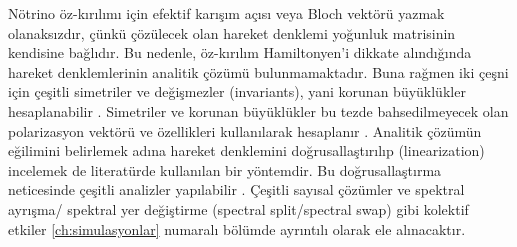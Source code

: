 Nötrino öz-kırılımı için efektif karışım açısı veya Bloch vektörü yazmak olanaksızdır, çünkü çözülecek olan hareket denklemi yoğunluk matrisinin kendisine bağlıdır. Bu nedenle, öz-kırılım Hamiltonyen'i dikkate alındığında hareket denklemlerinin analitik çözümü bulunmamaktadır. Buna rağmen iki çeşni için çeşitli simetriler ve değişmezler (invariants), yani korunan büyüklükler hesaplanabilir \cite{Pehlivan:2011hp}. Simetriler ve korunan büyüklükler bu tezde bahsedilmeyecek olan polarizasyon vektörü ve özellikleri kullanılarak hesaplanır \cite{fackler1986Massive}. Analitik çözümün eğilimini belirlemek adına hareket denklemini doğrusallaştırılıp (linearization) incelemek de literatürde kullanılan bir yöntemdir. Bu doğrusallaştırma neticesinde çeşitli analizler yapılabilir \cite{Chakraborty:2014lsa, Chakraborty:2019wxe, Xiong:2021dex}. Çeşitli sayısal çözümler ve spektral ayrışma/ spektral yer değiştirme (spectral split/spectral swap) gibi kolektif etkiler \ref{ch:simulasyonlar} numaralı bölümde ayrıntılı olarak ele alınacaktır.